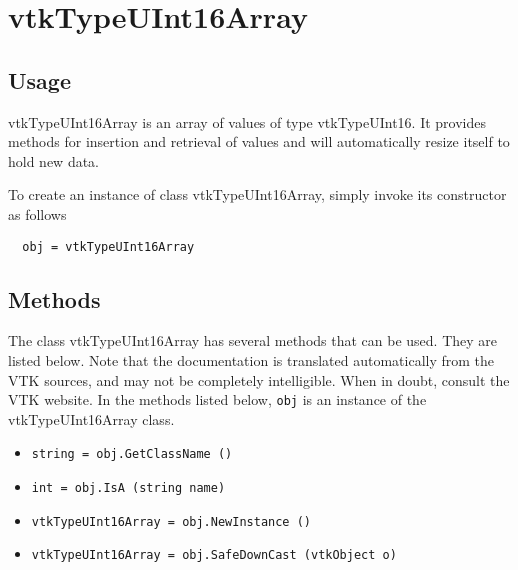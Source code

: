 \section{vtkTypeUInt16Array}

\subsection{Usage}

 vtkTypeUInt16Array is an array of values of type vtkTypeUInt16.  It
 provides methods for insertion and retrieval of values and will
 automatically resize itself to hold new data.

To create an instance of class vtkTypeUInt16Array, simply
invoke its constructor as follows
\begin{verbatim}
  obj = vtkTypeUInt16Array
\end{verbatim}
\subsection{Methods}

The class vtkTypeUInt16Array has several methods that can be used.
  They are listed below.
Note that the documentation is translated automatically from the VTK sources,
and may not be completely intelligible.  When in doubt, consult the VTK website.
In the methods listed below, \verb|obj| is an instance of the vtkTypeUInt16Array class.
\begin{itemize}
\item  \verb|string = obj.GetClassName ()|

\item  \verb|int = obj.IsA (string name)|

\item  \verb|vtkTypeUInt16Array = obj.NewInstance ()|

\item  \verb|vtkTypeUInt16Array = obj.SafeDownCast (vtkObject o)|

\end{itemize}
